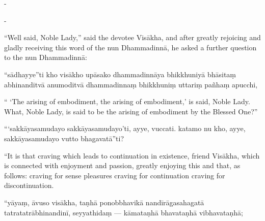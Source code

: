 \begin{samepage}
\begin{leftcolumn*}
-
\end{leftcolumn*}

\begin{rightcolumn}
-
\end{rightcolumn}
\end{samepage}

\begin{samepage}
\begin{leftcolumn*}
“Well said, Noble Lady,” said the devotee Visākha, and after greatly rejoicing and gladly receiving this word of the nun Dhammadinnā, he asked a further question to the nun Dhammadinnā:
\end{leftcolumn*}

\begin{rightcolumn}
“sādhayye”ti kho visākho upāsako dhammadinnāya bhikkhuniyā bhāsitaṃ abhinanditvā anumoditvā dhammadinnaṃ bhikkhuniṃ uttariṃ pañhaṃ apucchi,
\end{rightcolumn}
\end{samepage}

\begin{samepage}
\begin{leftcolumn*}
“ ‘The arising of embodiment, the arising of embodiment,’ is said, Noble Lady. What, Noble Lady, is said to be the arising of embodiment by the Blessed One?”
\end{leftcolumn*}

\begin{rightcolumn}
“‘sakkāyasamudayo sakkāyasamudayo’ti, ayye, vuccati. katamo nu kho, ayye, sakkāyasamudayo vutto bhagavatā”ti?
\end{rightcolumn}
\end{samepage}

\begin{samepage}
\begin{leftcolumn*}
“It is that craving which leads to continuation in existence, friend Visākha, which is connected with enjoyment and passion, greatly enjoying this and that, as follows: craving for sense pleasures craving for continuation craving for discontinuation.
\end{leftcolumn*}

\begin{rightcolumn}
“yāyaṃ, āvuso visākha, taṇhā ponobbhavikā nandīrāgasahagatā tatratatrābhinandinī, seyyathidaṃ — kāmataṇhā bhavataṇhā vibhavataṇhā;
\end{rightcolumn}
\end{samepage}

